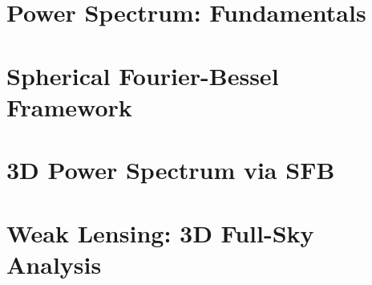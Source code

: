 
\chapter{Power Spectrum: Fundamentals}\label{ch:power_spectrum}

\newpage

\newpage

\newpage



\chapter{Spherical Fourier-Bessel Framework}\label{ch:sfb}

\newpage

\newpage

\newpage



\chapter{3D Power Spectrum via SFB}\label{ch:3d_ps}



\chapter{Weak Lensing: 3D Full-Sky Analysis}\label{ch:weak_lensing}

\newpage

\newpage

\newpage


